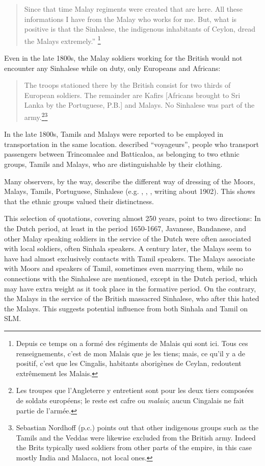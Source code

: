 \begin{quote}
Since that time Malay regiments were created that are here. All these informations I have from the Malay who works for me. But, what is positive is that the Sinhalese, the indigenous inhabitants of Ceylon, dread the Malays extremely.'' \footnote{Depuis
 ce temps on a formé des régiments de Malais qui sont ici. Tous ces renseignements, c'est de mon Malais que je les tiens; mais, ce qu'il y a de positif, c'est que les Cingalis, habitants aborigènes de Ceylan, redoutent extrêmement les Malais.
}  
\citep[27-28]{Soltykoff1853}
\end{quote}


Even in the late 1800s, the Malay soldiers working for the British would not encounter any Sinhalese while on duty, only Europeans and Africans:

\begin{quote}
The troops stationed there by the British consist for two thirds of European soldiers. The remainder are Kafirs [Africans brought to Sri Lanka by the Portuguese, P.B.] and Malays. No Sinhalese was part of the army.\footnote{Les
 troupes que l'Angleterre y entretient sont pour les deux tiers composées de soldats européens; le reste est cafre ou \emph{\textmd{malais}}; aucun Cingalais ne fait partie de l'armée.
}\footnote{Sebastian
 Nordhoff (p.c.) points out that other indigenous groups such as the Tamils and the Veddas were likewise excluded from the British army. Indeed the Brits typically used soldiers from other parts of the empire, in this case mostly India and Malacca, not local ones.
}\citep[412]{Cotteau1889}
\end{quote}



In the late 1800s, Tamils and Malays were reported to be employed in transportation in the same location. \citet[65]{Bruyas1898} described ``voyageurs'', people who transport passengers between Trincomalee and Batticaloa, as belonging to two ethnic groups, Tamils and Malays, who are distinguishable by their clothing. 

Many observers, by the way, describe the different way of dressing of the Moors, Malays, Tamils, Portuguese, Sinhalese (e.g. \citet{Soltykoff1840}, \citet[65]{Bruyas1898}, \citet[89]{Madrolle1926}, writing about 1902). This shows that the ethnic groups valued their distinctness.

This selection of quotations, covering almost 250 years, point to two directions: In the Dutch period, at least in the period 1650-1667, Javanese, Bandanese, and other Malay speaking soldiers in the service of the Dutch were often associated with local soldiers, often Sinhala speakers. A century later, the Malays seem to have had almost exclusively contacts with Tamil speakers. The Malays associate with Moors and speakers of Tamil, sometimes  even marrying them, while no connections with the Sinhalese are mentioned, except in the Dutch period, which may have extra weight as it took place in the formative period. On the contrary, the Malays in the service of the British massacred Sinhalese, who after this hated the Malays. This suggests potential influence from both Sinhala and Tamil on SLM.


